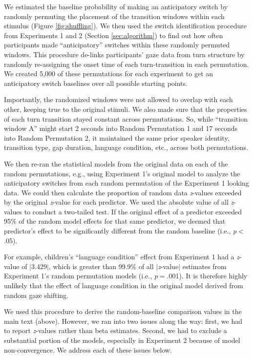 \documentclass[authoryear, 12pt]{elsarticle}
\begin{document}
We estimated the baseline probability of making an anticipatory switch by randomly permuting the placement of the transition windows within each stimulus (Figure \ref{fig:shuffling}). We then used the switch identification procedure from Experiments 1 and 2 (Section \ref{sec:algorithm}) to find out how often participants made ``anticipatory'' switches within these randomly permuted windows. This procedure de-links participants' gaze data from turn structure by randomly re-assigning the onset time of each turn-transition in each permutation. We created 5,000 of these permutations for each experiment to get an anticipatory switch baselines over all possible starting points.

Importantly, the randomized windows were not allowed to overlap with each other, keeping true to the original stimuli. We also made sure that the properties of each turn transition stayed constant across permutations. So, while ``transition window A'' might start 2 seconds into Random Permutation 1 and 17 seconds into Random Permutation 2, it maintained the same prior speaker identity, transition type, gap duration, language condition, etc., across both permutations.

We then re-ran the statistical models from the original data on each of the random permutations, e.g., using Experiment 1's original model to analyze the anticipatory switches from each random permutation of the Experiment 1 looking data. We could then calculate the proportion of random data \textit{z}-values exceeded by the original \textit{z}-value for each predictor. We used the absolute value of all \textit{z}-values to conduct a two-tailed test. If the original effect of a predictor exceeded 95\% of the random model effects for that same predictor, we deemed that predictor's effect to be significantly different from the random baseline (i.e., \textit{p}$<$.05).

For example, children's ``language condition'' effect from Experiment 1 had a \textit{z}-value of $|$3.429$|$, which is greater than 99.9\% of all $|$\textit{z}-value$|$ estimates from Experiment 1's random permutation models (i.e., \textit{p}$=$.001). It is therefore highly unlikely that the effect of language condition in the original model derived from random gaze shifting.

We used this procedure to derive the random-baseline comparison values in the main text (above). However, we ran into two issues along the way: first, we had to report \textit{z}-values rather than beta estimates. Second, we had to exclude a substantial portion of the models, especially in Experiment 2 because of model non-convergence. We address each of these issues below.
\end{document}
